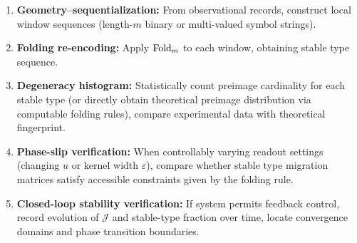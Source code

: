 \begin{enumerate}
  \item \textbf{Geometry--sequentialization:} From observational records, construct local window sequences (length-$m$ binary or multi-valued symbol strings).
  \item \textbf{Folding re-encoding:} Apply $\mathrm{Fold}_m$ to each window, obtaining stable type sequence.
  \item \textbf{Degeneracy histogram:} Statistically count preimage cardinality for each stable type (or directly obtain theoretical preimage distribution via computable folding rules), compare experimental data with theoretical fingerprint.
  \item \textbf{Phase-slip verification:} When controllably varying readout settings (changing $u$ or kernel width $\varepsilon$), compare whether stable type migration matrices satisfy accessible constraints given by the folding rule.
  \item \textbf{Closed-loop stability verification:} If system permits feedback control, record evolution of $\mathcal{J}$ and stable-type fraction over time, locate convergence domains and phase transition boundaries.
\end{enumerate}
